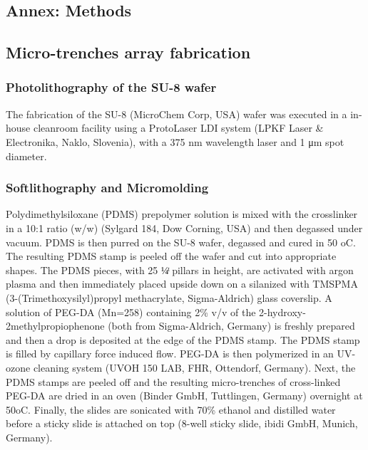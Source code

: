 \documentclass[pdftex,12pt,a4paper]{report}
\begin{document}





\begin{appendices}

\chapter{Annex: Methods}

\section*{Micro-trenches array fabrication} \label{appendix:microtrench}

\subsection*{Photolithography of the SU-8 wafer}

The fabrication of the SU-8 (MicroChem Corp, USA) wafer was executed in a in-house cleanroom facility using a ProtoLaser LDI system (LPKF Laser \& Electronika, Naklo, Slovenia), with a 375 nm wavelength laser and 1 μm spot diameter.

\subsection*{Softlithography and Micromolding}

Polydimethylsiloxane (PDMS) prepolymer solution is mixed with the crosslinker in a 10:1 ratio (w/w) (Sylgard 184, Dow Corning, USA) and then degassed under vacuum. PDMS is then purred on the SU-8 wafer, degassed and cured in 50 oC. The resulting PDMS stamp is peeled off the wafer and cut into appropriate shapes. The PDMS pieces, with 25 ¼ͭ pillars in height, are activated with argon plasma and then immediately placed upside down on a silanized with TMSPMA (3-(Trimethoxysilyl)propyl methacrylate, Sigma-Aldrich) glass coverslip. A solution of PEG-DA (Mn=258) containing 2\% v/v of the 2-hydroxy-2methylpropiophenone (both from Sigma-Aldrich, Germany) is freshly prepared and then a drop is deposited at the edge of the PDMS stamp. The PDMS stamp is filled by capillary force induced flow. PEG-DA is then polymerized in an UV-ozone cleaning system (UVOH 150 LAB, FHR, Ottendorf, Germany). Next, the PDMS stamps are peeled off and the resulting micro-trenches of cross-linked PEG-DA are dried in an oven (Binder GmbH, Tuttlingen, Germany) overnight at 50oC. Finally, the slides are sonicated with 70\% ethanol and distilled water before a sticky slide is attached on top (8-well sticky slide, ibidi GmbH, Munich, Germany).


\end{appendices}
\end{document}
